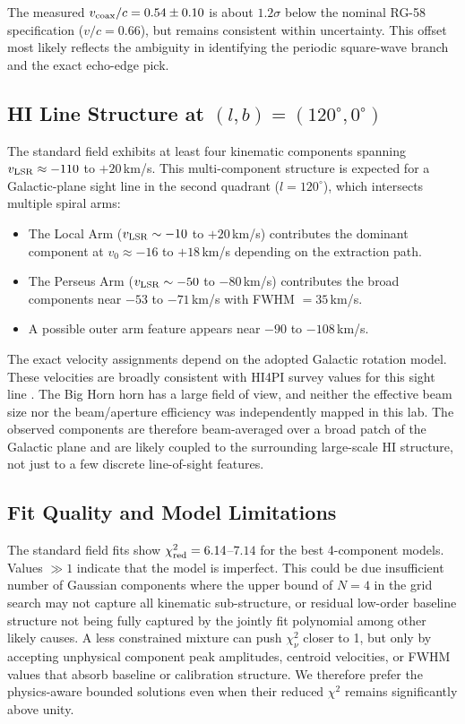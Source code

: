\documentclass[10pt,preprint2]{aastex}
\begin{document}
The measured $v_{\rm coax}/c = 0.54 \pm 0.10$ is about $1.2\sigma$ below
the nominal RG-58 specification ($v/c = 0.66$), but remains consistent
within uncertainty.
This offset most likely reflects the ambiguity in identifying the
periodic square-wave branch and the exact echo-edge pick.

\subsection{HI Line Structure at $(l,b) = (120^\circ, 0^\circ)$}

The standard field exhibits at least four kinematic components spanning
$v_{\rm LSR} \approx -110$ to $+20$\,km/s.
This multi-component structure is expected for a Galactic-plane sight line
in the second quadrant ($l = 120^\circ$), which intersects multiple spiral arms:
\begin{itemize}
  \item The Local Arm ($v_{\rm LSR} \sim -10$ to $+20$\,km/s) contributes
        the dominant component at $v_0 \approx -16$ to $+18$\,km/s
        depending on the extraction path.
  \item The Perseus Arm ($v_{\rm LSR} \sim -50$ to $-80$\,km/s) contributes
        the broad components near $-53$ to $-71$\,km/s with FWHM $= 35$\,km/s.
  \item A possible outer arm feature appears near $-90$ to $-108$\,km/s.
\end{itemize}
The exact velocity assignments depend on the adopted Galactic rotation model.
These velocities are broadly consistent with HI4PI survey values for this
sight line \citep{hi4pi2016,dickey1990,kalberla2009}.
The Big Horn horn has a large field of view, and neither the effective beam
size nor the beam/aperture efficiency was independently mapped in this lab.
The observed components are therefore beam-averaged over a broad patch of the
Galactic plane and are likely coupled to the surrounding large-scale HI
structure, not just to a few discrete line-of-sight features.

\subsection{Fit Quality and Model Limitations}

The standard field fits show $\chi^2_{\rm red} = 6.14$--$7.14$ for the best 4-component models.
Values $\gg 1$ indicate that the model is imperfect. This could be due insufficient number of Gaussian components where the upper bound of
$N = 4$ in the grid search may not capture all kinematic sub-structure, or residual low-order baseline structure not being fully captured by the jointly fit polynomial among other likely causes.
A less constrained mixture can push
$\chi^2_\nu$ closer to 1, but only by accepting unphysical component peak
amplitudes, centroid velocities, or FWHM values that absorb baseline or
calibration structure. We therefore prefer the physics-aware bounded
solutions even when their reduced $\chi^2$ remains significantly above unity.
\end{document}
